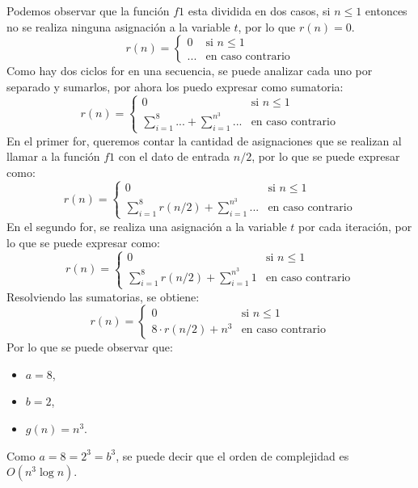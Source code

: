 Podemos observar que la función $f1$ esta dividida en dos casos, si $n \leq 1$ entonces no se realiza ninguna asignación a la variable $t$, por lo que $r(n) = 0$.
\begin{equation*}
    r(n) = 
    \begin{cases}
        0 & \text{si } n \leq 1 \\
        ... & \text{en caso contrario}
    \end{cases}
\end{equation*}
Como hay dos ciclos for en una secuencia, se puede analizar cada uno por separado y sumarlos, por ahora los puedo expresar como sumatoria:
\begin{equation*}
    r(n) = 
    \begin{cases}
        0 & \text{si } n \leq 1 \\
        \sum_{i=1}^{8} ... + \sum_{i=1}^{n^3} ... & \text{en caso contrario}
    \end{cases}
\end{equation*}
En el primer for, queremos contar la cantidad de asignaciones que se realizan al llamar a la función $f1$ con el dato de entrada $n/2$, por lo que se puede expresar como:
\begin{equation*}
    r(n) = 
    \begin{cases}
        0 & \text{si } n \leq 1 \\
        \sum_{i=1}^{8} r(n/2) + \sum_{i=1}^{n^3} ... & \text{en caso contrario}
    \end{cases}
\end{equation*}
En el segundo for, se realiza una asignación a la variable $t$ por cada iteración, por lo que se puede expresar como:
\begin{equation*}
    r(n) = 
    \begin{cases}
        0 & \text{si } n \leq 1 \\
        \sum_{i=1}^{8} r(n/2) + \sum_{i=1}^{n^3} 1 & \text{en caso contrario}
    \end{cases}
\end{equation*}
Resolviendo las sumatorias, se obtiene:
\begin{equation*}
    r(n) = 
    \begin{cases}
        0 & \text{si } n \leq 1 \\
        8 \cdot r(n/2) + n^3 & \text{en caso contrario}
    \end{cases}
\end{equation*}
Por lo que se puede observar que:
\begin{itemize}
    \item $a = 8$,
    \item $b = 2$,
    \item $g(n) = n^3$.
\end{itemize}
Como $a = 8 = 2^3 = b^3$, se puede decir que el orden de complejidad es $O(n^3 \log n)$.

